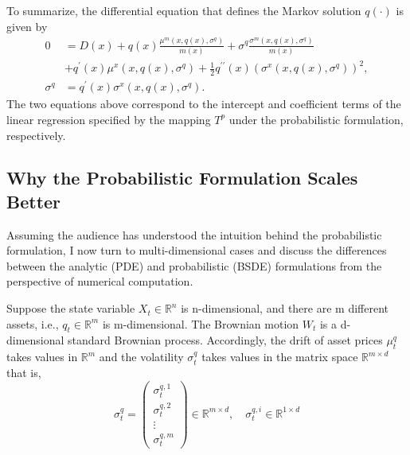 \documentclass{article}
\begin{document}
To summarize, the differential equation that defines the Markov solution $q(\cdot)$ is given by
\begin{align*}
0&=D(x)+q(x)\frac{\mu^{m}(x,q(x),\sigma^{q})}{m(x)}+\sigma^{q}\frac{\sigma^{m}(x,q(x),\sigma^{q})}{m(x)} \\
&+q^{\prime}(x)\mu^{x}(x,q(x),\sigma^{q})+\frac{1}{2}q^{\prime\prime}(x)(\sigma^{x}(x,q(x),\sigma^{q}))^{2}, \\
\sigma^{q}&=q^{\prime}(x)\sigma^{x}(x,q(x),\sigma^{q}).
\end{align*}
The two equations above correspond to the intercept and coefficient terms of the linear regression specified by the mapping $T^p$ under the probabilistic formulation, respectively.

\subsection{Why the Probabilistic Formulation Scales Better}

Assuming the audience has understood the intuition behind the probabilistic formulation, I now turn to multi-dimensional cases and discuss the differences between the analytic (PDE) and probabilistic (BSDE) formulations from the perspective of numerical computation.

Suppose the state variable $X_{t}\in\mathbb{R}^{n}$ is n-dimensional, and there are m different assets, i.e., $q_{t}\in\mathbb{R}^{m}$ is m-dimensional. The Brownian motion $W_{t}$ is a d-dimensional standard Brownian process. Accordingly, the drift of asset prices $\mu_{t}^{q}$ takes values in $\mathbb{R}^{m}$ and the volatility $\sigma_{t}^{q}$ takes values in the matrix space $\mathbb{R}^{m\times d}$ that is,
\[
\sigma_t^q = \begin{pmatrix}
\sigma_t^{q,1} \\
\sigma_t^{q,2} \\
\vdots \\
\sigma_t^{q,m}
\end{pmatrix} \in \mathbb{R}^{m\times d}, \quad \sigma_t^{q,i} \in \mathbb{R}^{1\times d}
\]

\clearpage
\end{document}
